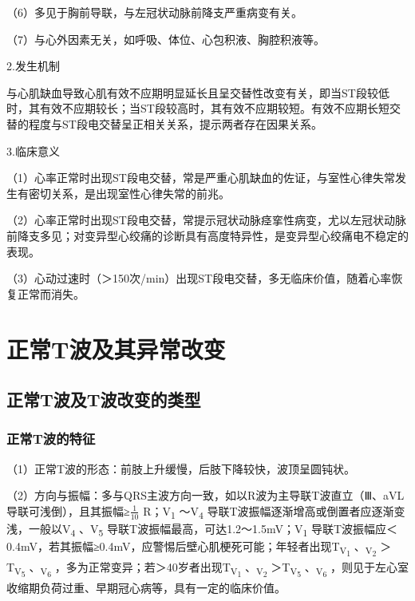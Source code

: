 （6）多见于胸前导联，与左冠状动脉前降支严重病变有关。

（7）与心外因素无关，如呼吸、体位、心包积液、胸腔积液等。

2.发生机制

与心肌缺血导致心肌有效不应期明显延长且呈交替性改变有关，即当ST段较低时，其有效不应期较长；当ST段较高时，其有效不应期较短。有效不应期长短交替的程度与ST段电交替呈正相关关系，提示两者存在因果关系。

3.临床意义

（1）心率正常时出现ST段电交替，常是严重心肌缺血的佐证，与室性心律失常发生有密切关系，是出现室性心律失常的前兆。

（2）心率正常时出现ST段电交替，常提示冠状动脉痉挛性病变，尤以左冠状动脉前降支多见；对变异型心绞痛的诊断具有高度特异性，是变异型心绞痛电不稳定的表现。

（3）心动过速时（＞150次/min）出现ST段电交替，多无临床价值，随着心率恢复正常而消失。

\protect\hypertarget{text00012.html}{}{}

\protect\hypertarget{text00012.htmlux5cux23chapter12}{}{}

\chapter{正常T波及其异常改变}

\protect\hypertarget{text00012.htmlux5cux23subid84}{}{}

\section{正常T波及T波改变的类型}

\protect\hypertarget{text00012.htmlux5cux23subid85}{}{}

\subsection{正常T波的特征}

（1）正常T波的形态：前肢上升缓慢，后肢下降较快，波顶呈圆钝状。

（2）方向与振幅：多与QRS主波方向一致，如以R波为主导联T波直立（Ⅲ、aVL导联可浅倒），且其振幅≥$\frac{1}{10}$
R；V\textsubscript{1} ～V\textsubscript{4}
导联T波振幅逐渐增高或倒置者应逐渐变浅，一般以V\textsubscript{4}
、V\textsubscript{5} 导联T波振幅最高，可达1.2～1.5mV；V\textsubscript{1}
导联T波振幅应＜0.4mV，若其振幅≥0.4mV，应警惕后壁心肌梗死可能；年轻者出现T\textsubscript{V\textsubscript{1}}
、\textsubscript{V\textsubscript{2}}
＞T\textsubscript{V\textsubscript{5}}
、\textsubscript{V\textsubscript{6}}
，多为正常变异；若＞40岁者出现T\textsubscript{V\textsubscript{1}}
、\textsubscript{V\textsubscript{2}}
＞T\textsubscript{V\textsubscript{5}}
、\textsubscript{V\textsubscript{6}}
，则见于左心室收缩期负荷过重、早期冠心病等，具有一定的临床价值。


